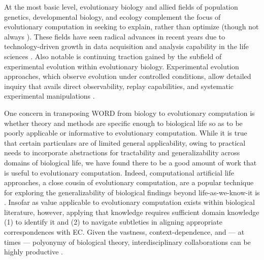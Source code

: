 At the most basic level, evolutionary biology and allied fields of population genetics, developmental biology, and ecology complement the focus of evolutionary computation in seeking to explain, rather than optimize (though not always \citep{cobb2013directed,carroll2014applying}).
These fields have seen radical advances in recent years due to technology-driven growth in data acquisition and analysis capability in the life sciences \citep{math2018omics,deshpande2024evolution}.
Also notable is continuing traction gained by the subfield of experimental evolution within evolutionary biology.
Experimental evolution approaches, which observe evolution under controlled conditions, allow detailed inquiry that avails direct observability, replay capabilities, and systematic experimental manipulations \citep{kawecki2012experimental}.

One concern in transposing WORD from biology to evolutionary computation is whether theory and methods are specific enough to biological life so as to be poorly applicable or informative to evolutionary computation.
While it is true that certain particulars are of limited general applicability, owing to practical needs to incorporate abstractions for tractability and generalizability across domains of biological life, we have found there to be a good amount of work that is useful to evolutionary computation.
Indeed, computational artificial life approaches, a close cousin of evolutionary computation, are a popular technique for exploring the generalizability of biological findings beyond life-as-we-know-it is \citep{cleland2013general,langton1989artificial,pennock2007models}. %
Insofar as value applicable to evolutionary computation exists within biological literature, however, applying that knowledge requires sufficient domain knowledge (1) to identify it and (2) to navigate subtleties in aligning appropriate correspondences with EC.
Given the vastness, context-dependence, and --- at times --- polyonymy of biological theory, interdisciplinary collaborations can be highly productive \citep{goodman2020evolution}.

